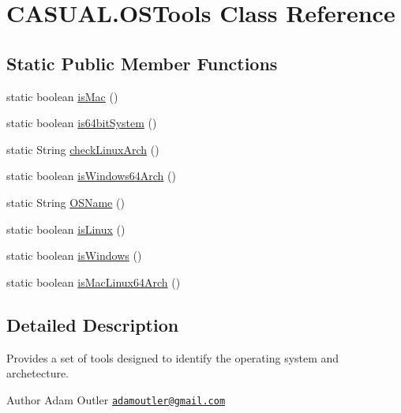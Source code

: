 \hypertarget{class_c_a_s_u_a_l_1_1_o_s_tools}{\section{C\-A\-S\-U\-A\-L.\-O\-S\-Tools Class Reference}
\label{class_c_a_s_u_a_l_1_1_o_s_tools}
}
\subsection*{Static Public Member Functions}
\begin{DoxyCompactItemize}
\item 
static boolean \hyperlink{class_c_a_s_u_a_l_1_1_o_s_tools_a0e56ffe8c5d4bb116822b580bc446f88}{is\-Mac} ()
\item 
static boolean \hyperlink{class_c_a_s_u_a_l_1_1_o_s_tools_a8068ad9e8a1c65f19983881b0e0b24a1}{is64bit\-System} ()
\item 
static String \hyperlink{class_c_a_s_u_a_l_1_1_o_s_tools_aec6bfc5a30c3575087ed4f01fe097224}{check\-Linux\-Arch} ()
\item 
static boolean \hyperlink{class_c_a_s_u_a_l_1_1_o_s_tools_aba47c5eb8808b1068b08e95879dd3398}{is\-Windows64\-Arch} ()
\item 
static String \hyperlink{class_c_a_s_u_a_l_1_1_o_s_tools_a30268489d47f25c2bf74fc081e2f059a}{O\-S\-Name} ()
\item 
static boolean \hyperlink{class_c_a_s_u_a_l_1_1_o_s_tools_a41ba4fa3af5e04583de46598a9d39e73}{is\-Linux} ()
\item 
static boolean \hyperlink{class_c_a_s_u_a_l_1_1_o_s_tools_ab0171f3f220d9e3bdbf131e0f0546e00}{is\-Windows} ()
\item 
static boolean \hyperlink{class_c_a_s_u_a_l_1_1_o_s_tools_a5fd7419f960454a449ec1aa1e77b2548}{is\-Mac\-Linux64\-Arch} ()
\end{DoxyCompactItemize}


\subsection{Detailed Description}
Provides a set of tools designed to identify the operating system and archetecture.

\begin{DoxyAuthor}{Author}
Adam Outler \href{mailto:adamoutler@gmail.com}{\tt adamoutler@gmail.\-com} 
\end{DoxyAuthor}


